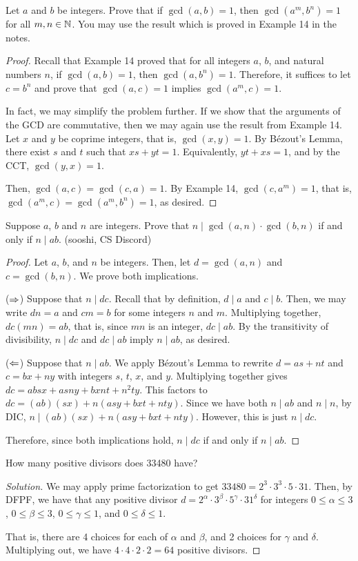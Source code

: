 \documentclass{agony}
\begin{document}
\question Let $a$ and $b$ be integers.
Prove that if $\gcd(a, b) = 1$, then $\gcd(a^m, b^n) = 1$ for all $m,n\in\mathbb{N}$.
You may use the result which is proved in Example 14 in the notes.
\begin{proof}
  Recall that Example 14 proved that for all integers $a$, $b$, and natural numbers $n$,
  if $\gcd(a, b)=1$, then $\gcd(a, b^n)=1$.
  Therefore, it suffices to let $c=b^n$ and prove that $\gcd(a, c)=1$ implies $\gcd(a^m, c)=1$.

  In fact, we may simplify the problem further.
  If we show that the arguments of the GCD are commutative,
  then we may again use the result from Example 14.
  Let $x$ and $y$ be coprime integers, that is, $\gcd(x,y)=1$.
  By Bézout's Lemma, there exist $s$ and $t$ such that $xs+yt=1$.
  Equivalently, $yt+xs=1$, and by the CCT, $\gcd(y,x)=1$.

  Then, $\gcd(a,c)=\gcd(c,a)=1$.
  By Example 14, $\gcd(c,a^m)=1$, that is, $\gcd(a^m,c)=\gcd(a^m,b^n)=1$, as desired.
\end{proof}


\question Suppose $a$, $b$ and $n$ are integers.
Prove that $n \mid \gcd(a, n) \cdot \gcd(b, n)$ if and only if $n \mid ab$.
(sooshi, CS Discord)
\begin{proof}
  Let $a$, $b$, and $n$ be integers.
  Then, let $d=\gcd(a,n)$ and $c=\gcd(b,n)$.
  We prove both implications.

  ($\Rightarrow$) Suppose that $n \mid dc$.
  Recall that by definition, $d \mid a$ and $c \mid b$.
  Then, we may write $dn=a$ and $cm=b$ for some integers $n$ and $m$.
  Multiplying together, $dc(mn)=ab$, that is, since $mn$ is an integer, $dc \mid ab$.
  By the transitivity of divisibility, $n \mid dc$ and $dc \mid ab$ imply $n \mid ab$, as desired.

  ($\Leftarrow$) Suppose that $n \mid ab$.
  We apply Bézout's Lemma to rewrite $d=as+nt$ and $c=bx+ny$ with integers $s$, $t$, $x$, and $y$.
  Multiplying together gives $dc = absx+asny+bxnt+n^2ty$.
  This factors to $dc = (ab)(sx)+n(asy+bxt+nty)$.
  Since we have both $n \mid ab$ and $n \mid n$, by DIC, $n \mid (ab)(sx)+n(asy+bxt+nty)$.
  However, this is just $n \mid dc$.

  Therefore, since both implications hold, $n \mid dc$ if and only if $n \mid ab$.
\end{proof}


\question How many positive divisors does 33480 have?
\begin{proof}[Solution]
  We may apply prime factorization to get $33480=2^3\cdot3^3\cdot5\cdot31$.
  Then, by DFPF, we have that any positive divisor $d=2^\alpha\cdot3^\beta\cdot5^\gamma\cdot31^\delta$
  for integers $0\leq\alpha\leq3$, $0\leq\beta\leq3$, $0\leq\gamma\leq1$, and $0\leq\delta\leq1$.

  That is, there are 4 choices for each of $\alpha$ and $\beta$, and 2 choices for $\gamma$ and $\delta$.
  Multiplying out, we have $4\cdot4\cdot2\cdot2=64$ positive divisors.
\end{proof}
\end{document}
